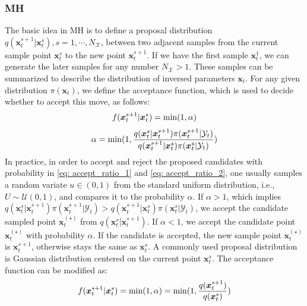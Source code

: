 \subsubsection{\acrfull{MH}}
The basic idea in \acrshort{MH} is to define a proposal distribution $q(\boldsymbol{x}_{t}^{s+1}|\boldsymbol{x}_{t}^{s}),s=1,\cdots,N_{\mathcal{X}}$, between two adjacent samples from the current sample point $\boldsymbol{x}_{t}^{s}$ to the new point $\boldsymbol{x}_{t}^{s+1}$. If we have the first sample $\boldsymbol{x}_{t}^{1}$, we can generate the later samples for any number $N_{\mathcal{X}} > 1$. These samples can be summarized to describe the distribution of inversed parameters $\boldsymbol{x}_{t}$. For any given distribution $\pi(\boldsymbol{x}_{t})$, we define the acceptance function, which is used to decide whether to accept this move, as follows:
\begin{equation}
    \label{eq: accept_ratio_1}    f(\boldsymbol{x}_{t}^{s+1}|\boldsymbol{x}_{t}^{s})=\rm{min}(1,\alpha)
\end{equation}
\begin{equation}
    \label{eq: accept_ratio_2}    
\alpha = {\rm{min}} (1,
\frac{q(\boldsymbol{x}_{t}^{s}|\boldsymbol{x}_{t}^{s+1})  \pi(\boldsymbol{x}_{t}^{s+1}|\mathcal{Y}_{t})}
{q(\boldsymbol{x}_{t}^{s+1}|\boldsymbol{x}_{t}^{s})   \pi(\boldsymbol{x}_{t}^{s}|\mathcal{Y}_{t})} )
\end{equation}
In practice, in order to accept and reject the proposed candidates with probability in \cref{eq: accept_ratio_1} and \cref{eq: accept_ratio_2}, one usually samples a random variate $u \in (0,1)$ from the standard uniform distribution, i.e., $U \sim \mathcal{U}(0,1)$, and compares it to the probability $\alpha$. If $\alpha > 1$, which implies $q(\boldsymbol{x}_{t}^{s}|\boldsymbol{x}_{t}^{s+1})  \pi(\boldsymbol{x}_{t}^{s+1}|\mathcal{Y}_{t})  > q(\boldsymbol{x}_{t}^{s+1}|\boldsymbol{x}_{t}^{s})   \pi(\boldsymbol{x}_{t}^{s}|\mathcal{Y}_{t})$, we accept the candidate sampled point $\boldsymbol{x}_{t}^{(\star)}$ from $q(\boldsymbol{x}_{t}^{s}|\boldsymbol{x}_{t}^{s+1})$. If $\alpha < 1$, we accept the candidate point $\boldsymbol{x}_{t}^{(\star)}$ with probability $\alpha$. If the candidate is accepted, the new sample point $\boldsymbol{x}_{t}^{(\star)}$ is $\boldsymbol{x}_{t}^{s+1}$, otherwise stays the same as $\boldsymbol{x}_{t}^{s}$. A commonly used proposal distribution is Gaussian distribution centered on the current point $\boldsymbol{x}_{t}^{s}$. The acceptance function can be modified as:
\begin{equation}
    \label{eq: accept_function_Gaussian_distribution}    
f(\boldsymbol{x}_{t}^{s+1}|\boldsymbol{x}_{t}^{s})={\rm{min}}(1,\alpha)={\rm{min}}(1,\frac{q(\boldsymbol{x}_{t}^{s+1})}
{q(\boldsymbol{x}_{t}^{s})})
\end{equation}
